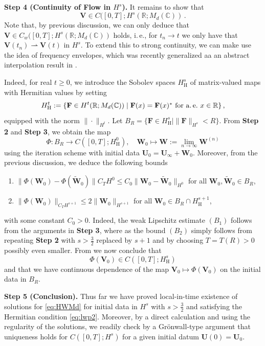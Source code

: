 \documentclass[11pt,reqno]{amsart}
\theoremstyle{definition}
\theoremstyle{remark}
\theoremstyle{remark}
\numberwithin{equation}{section}
\newcommand{\C}{\mathbb{C}}
\newcommand{\R}{\mathbb{R}}
\newcommand{\weakto}{\rightharpoonup}
\newcommand{\Vb}{\mathbf{V}}
\newcommand{\Wb}{\mathbf{W}}
\newcommand{\Ub}{\mathbf{U}}
\newcommand{\Fb}{\mathbf{F}}
\begin{document}
\begin{appendix}
\medskip
{\bf Step 4 (Continuity of Flow in $H^s$).} It remains to show that 
$$
\Vb \in C([0,T]; H^s(\R; M_d(\C)) \, .
$$
Note that, by previous discussion, we can only deduce that $\Vb \in C_{w}([0,T];  H^s(\R; M_d(\C))$ holds, i.\,e., for $t_n \to t$ we only have that $\Vb(t_n) \weakto \Vb(t)$ in $H^s$. To extend this to strong continuity, we can make use the idea of frequency envelopes, which was recently generalized aa an abstract interpolation result in \cite{AlBuIfTaZu-24}. 

Indeed, for real $t \geq 0$, we introduce the Sobolev spaces $H^s_{\mathrm{H}}$ of matrix-valued maps with Hermitian values by setting
$$
H^t_{\mathrm{H}} := \{ \Fb \in H^t(\R; M_d(\C)) \mid \mbox{$\Fb(x) = \Fb(x)^*$ for a.\,e.~$x \in \R$} \} \, ,
$$
equipped with the norm $\| \cdot \|_{H^t}$. Let $B_R = \{ \Fb \in H^s_{\mathrm{H}} \mid \| \Fb \|_{H^s} < R \}$. From \textbf{Step 2} and \textbf{Step 3}, we obtain the map
$$
\Phi : B_R \to C([0,T]; H^{0}_{\mathrm{H}}), \quad \Wb_0 \mapsto \Wb := \lim_{n \to \infty} \Wb^{(n)} 
$$
using the iteration scheme with initial data $\Ub_0 = \Ub_\infty + \Wb_0$. Moreover, from the previous discussion, we deduce the following bounds 
\begin{enumerate}
\item[$(B_1)$]  $\| \Phi(\Wb_0) - \Phi(\widetilde{\Wb}_0) \|{C_T H^0} \leq C_0 \| \Wb_0 - \widetilde{\Wb}_0 \|_{H^0}$ for all $\Wb_0, \widetilde{\Wb}_0 \in B_R$,
\item[$(B_2)$] $\| \Phi(\Wb_0) \|_{C_T H^{s+1}} \leq 2 \| \Wb_0 \|_{H^{s+1}}$ for all $\Wb_0 \in B_R \cap H^{s+1}_{\mathrm{H}}$,
\end{enumerate}
with some constant $C_0 > 0$. Indeed, the weak Lipschitz estimate $(B_1)$ follows from the arguments in \textbf{Step 3}, where as the bound $(B_2)$  simply follows from repeating \textbf{Step 2} with $s>\frac{3}{2}$ replaced by $s+1$ and by choosing $T=T(R) > 0$ possibly even smaller. From \cite{AlBuIfTaZu-24} we now conclude that 
$$
\Phi(\Vb_0) \in C([0,T]; H^s_{\mathrm{H}})
$$
and that we have continuous dependence of the map $\Vb_0 \mapsto \Phi(\Vb_0)$ on the initial data in $B_R$.


\medskip
\textbf{Step 5 (Conclusion).} Thus far we have proved local-in-time existence of solutions for \eqref{eq:HWMd} for initial data in $H^s$ with $s > \frac{3}{2}$ and satisfying the Hermitian condition \eqref{eq:lwp2}. Moreover, by a direct calculation and using the regularity of the solutions, we readily check by a Gr\"onwall-type argument that uniqueness holds for $C([0,T]; H^s)$ for a given initial datum $\Ub(0) = \Ub_0$. 


\end{appendix}
\end{document}
